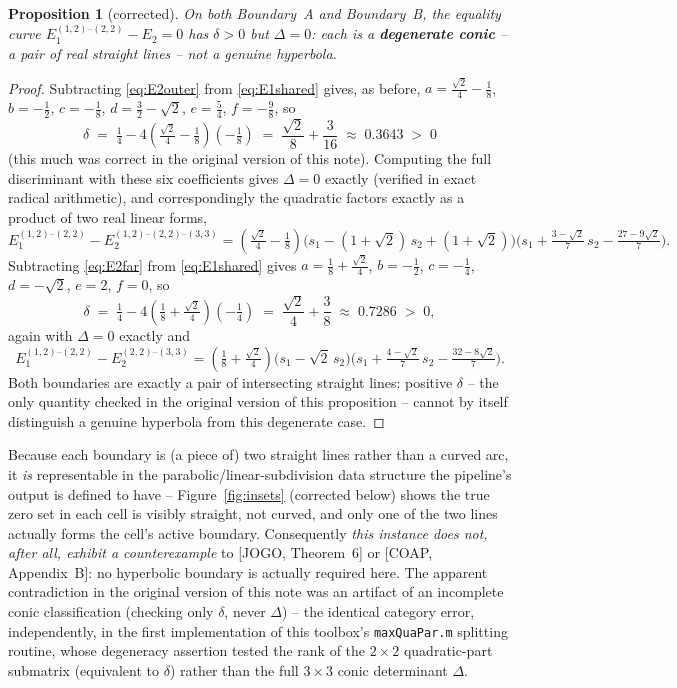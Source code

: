 \documentclass[11pt]{article}
\newtheorem{proposition}{Proposition}
\begin{document}
\begin{proposition}[corrected]
\label{prop:hyperbola}
On both Boundary~A and Boundary~B, the equality curve
$E_1^{(1,2)\text{--}(2,2)} - E_2 = 0$ has $\delta>0$ but $\Delta=0$: each is a
\textbf{degenerate conic} -- a pair of real straight lines -- not a genuine
hyperbola.
\end{proposition}

\begin{proof}
Subtracting \eqref{eq:E2outer} from \eqref{eq:E1shared} gives, as before,
$a=\tfrac{\sqrt2}4-\tfrac18$, $b=-\tfrac12$, $c=-\tfrac18$,
$d=\tfrac32-\sqrt2$, $e=\tfrac54$, $f=-\tfrac98$, so
\[
\delta \;=\; \tfrac14 - 4\left(\tfrac{\sqrt2}4-\tfrac18\right)\left(-\tfrac18\right)
\;=\; \frac{\sqrt2}{8}+\frac{3}{16} \;\approx\; 0.3643 \;>\;0
\]
(this much was correct in the original version of this note). Computing the
full discriminant with these six coefficients gives $\Delta=0$ exactly
(verified in exact radical arithmetic), and correspondingly the quadratic
factors exactly as a product of two real linear forms,
\[
E_1^{(1,2)\text{--}(2,2)} - E_2^{(1,2)\text{--}(2,2)\text{--}(3,3)}
= \left(\tfrac{\sqrt2}4-\tfrac18\right)
  \Big(s_1 - (1+\sqrt2)\,s_2 + (1+\sqrt2)\Big)
  \Big(s_1 + \tfrac{3-\sqrt2}{7}\,s_2 - \tfrac{27-9\sqrt2}{7}\Big).
\]
Subtracting \eqref{eq:E2far} from \eqref{eq:E1shared} gives
$a=\tfrac18+\tfrac{\sqrt2}4$, $b=-\tfrac12$, $c=-\tfrac14$, $d=-\sqrt2$,
$e=2$, $f=0$, so
\[
\delta \;=\; \tfrac14 - 4\left(\tfrac18+\tfrac{\sqrt2}4\right)\left(-\tfrac14\right)
\;=\; \frac{\sqrt2}{4}+\frac{3}{8} \;\approx\; 0.7286 \;>\;0,
\]
again with $\Delta=0$ exactly and
\[
E_1^{(1,2)\text{--}(2,2)} - E_2^{(2,2)\text{--}(3,3)}
= \left(\tfrac18+\tfrac{\sqrt2}4\right)
  \big(s_1-\sqrt2\,s_2\big)
  \Big(s_1 + \tfrac{4-\sqrt2}{7}\,s_2 - \tfrac{32-8\sqrt2}{7}\Big).
\]
Both boundaries are exactly a pair of intersecting straight lines: positive
$\delta$ -- the only quantity checked in the original version of this
proposition -- cannot by itself distinguish a genuine hyperbola from this
degenerate case.
\end{proof}

Because each boundary is (a piece of) two straight lines rather than a
curved arc, it \emph{is} representable in the parabolic/linear-subdivision
data structure the pipeline's output is defined to have --
Figure~\ref{fig:insets} (corrected below) shows the true zero set in each
cell is visibly straight, not curved, and only one of the two lines actually
forms the cell's active boundary. Consequently \emph{this instance does not,
after all, exhibit a counterexample} to [JOGO, Theorem~6] or [COAP,
Appendix~B]: no hyperbolic boundary is actually required here. The apparent
contradiction in the original version of this note was an artifact of an
incomplete conic classification (checking only $\delta$, never $\Delta$) --
the identical category error, independently, in the first implementation of
this toolbox's \texttt{maxQuaPar.m} splitting routine, whose degeneracy
assertion tested the rank of the $2\times2$ quadratic-part submatrix
(equivalent to $\delta$) rather than the full $3\times3$ conic determinant
$\Delta$.
\end{document}
